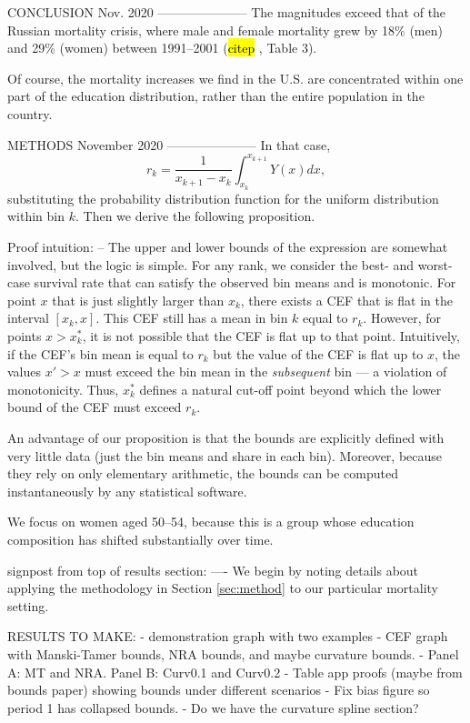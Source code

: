 \begin{center}
CONCLUSION Nov. 2020
---------------------
The magnitudes exceed that of the Russian mortality crisis, where male and female mortality grew by 18\% (men) and 29\% (women) between 1991--2001 (\hl{citep }, Table 3).
\begin{comment}
https://www.ncbi.nlm.nih.gov/pmc/articles/PMC259165/#:~:text=Results%
\end{comment}
Of course, the mortality increases we find in the U.S. are concentrated within one part of the education distribution, rather than the entire population in the country.


METHODS November 2020
---------------------
In that case, $$ r_k = \frac{1}{x_{k+1} - x_k} \int_{x_k}^{x_{k+1}}
Y(x)dx,$$ substituting the probability distribution function for the
uniform distribution within bin $k$. Then we derive the following
proposition. 

Proof intuition:
--
The upper and lower bounds of the
expression are somewhat involved,
but the logic is simple. For any rank, we consider the best- and
worst-case survival rate that can satisfy the observed bin means
and is monotonic. For point $x$ that is just slightly larger than
$x_k$, there exists a CEF that is flat in the interval $[x_k,x]$. This
CEF still has a mean in bin $k$ equal to $r_k$. However, for points $x >
x_k^*$, it is not possible that the CEF is flat up to that
point. Intuitively, if the CEF's bin mean is equal to $r_k$ but the value of
the CEF is flat up to $x$, the values $x' >
x$ must exceed the bin mean in the \textit{subsequent} bin --- a
violation of monotonicity. Thus, $x_k^*$ defines a natural cut-off point beyond which the lower bound
of the CEF must exceed $r_k$. 

An advantage of our proposition is that
the bounds are explicitly defined with very little data (just the bin
means and share in each bin). Moreover, because they rely on only elementary
arithmetic, the bounds can be computed instantaneously by any
statistical software.

We focus on women aged 50--54, because this is a group whose education composition has shifted substantially over time.

signpost from top of results section:
----
We begin by noting details about applying the methodology in Section
\ref{sec:method} to our particular mortality setting. 


RESULTS TO MAKE:
- demonstration graph with two examples
- CEF graph with Manski-Tamer bounds, NRA bounds, and maybe curvature bounds.
  - Panel A: MT and NRA.  Panel B: Curv0.1 and Curv0.2
- Table app proofs (maybe from bounds paper) showing bounds under different scenarios
- Fix bias figure so period 1 has collapsed bounds.
- Do we have the curvature spline section?


\end{center}
